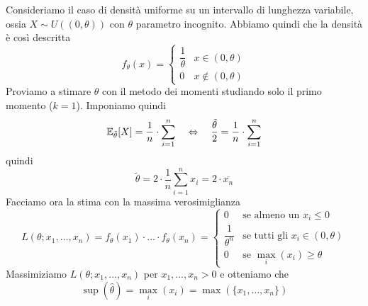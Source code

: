 \begin{example}
	Consideriamo il caso di densità uniforme su un intervallo di lunghezza variabile, ossia
	$X \sim U((0, \theta))$ con $\theta$ parametro incognito. Abbiamo quindi che la densità è così
	descritta
	\[
		f_\theta(x) = \begin{cases}
			\dfrac{1}{\theta} & x \in (0, \theta)    \\[2ex]
			0                 & x \notin (0, \theta)
		\end{cases}
	\]
	Proviamo a stimare $\theta$ con il metodo dei momenti studiando solo il primo momento ($k=1$).
	Imponiamo quindi
	\[
		\mathbb{E}_{\tilde{\theta}}[X] = \frac{1}{n} \cdot \sum_{i=1}^n
		\quad \Leftrightarrow \quad
		\frac{\tilde{\theta}}{2} = \frac{1}{n} \cdot \sum_{i=1}^n
	\]
	quindi
	\[ \tilde{\theta} = 2 \cdot \frac{1}{n} \sum_{i=1}^n x_i = 2 \cdot \overline{x_n} \]
	Facciamo ora la stima con la massima verosimiglianza
	\[
		L(\theta; x_1, \dots, x_n) = f_\theta (x_1) \cdot \ldots \cdot f_\theta (x_n) =
		\begin{cases}
			0                   & \text{se almeno un } x_i \leq 0          \\[1ex]
			\dfrac{1}{\theta^n} & \text{se tutti gli } x_i \in (0, \theta) \\[1ex]
			0                   & \text{se } \max_i (x_i) \geq \theta
		\end{cases}
	\]
	Massimiziamo $L(\theta; x_1, \dots, x_n)$ per $x_1, \dots, x_n > 0$ e otteniamo che
	\[ \sup (\hat{\theta}) = \max_i (x_i) = \max (\{x_1, \dots, x_n\}) \]
\end{example}